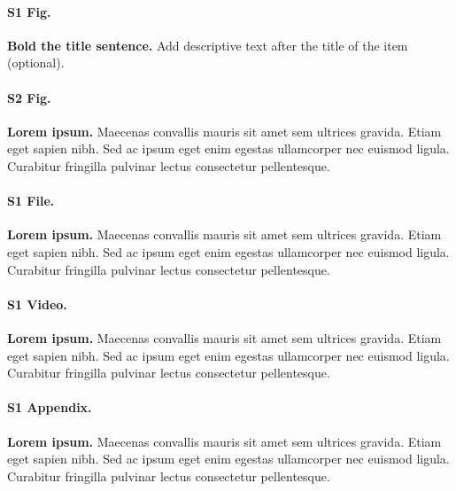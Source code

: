 \documentclass[10pt,letterpaper]{article}
\begin{document}
\paragraph*{S1 Fig.}
\label{S1_Fig}
{\bf Bold the title sentence.} Add descriptive text after the title of the item (optional).

\paragraph*{S2 Fig.}
\label{S2_Fig}
{\bf Lorem ipsum.} Maecenas convallis mauris sit amet sem ultrices gravida. Etiam eget sapien nibh. Sed ac ipsum eget enim egestas ullamcorper nec euismod ligula. Curabitur fringilla pulvinar lectus consectetur pellentesque.

\paragraph*{S1 File.}
\label{S1_File}
{\bf Lorem ipsum.}  Maecenas convallis mauris sit amet sem ultrices gravida. Etiam eget sapien nibh. Sed ac ipsum eget enim egestas ullamcorper nec euismod ligula. Curabitur fringilla pulvinar lectus consectetur pellentesque.

\paragraph*{S1 Video.}
\label{S1_Video}
{\bf Lorem ipsum.}  Maecenas convallis mauris sit amet sem ultrices gravida. Etiam eget sapien nibh. Sed ac ipsum eget enim egestas ullamcorper nec euismod ligula. Curabitur fringilla pulvinar lectus consectetur pellentesque.

\paragraph*{S1 Appendix.}
\label{S1_Appendix}
{\bf Lorem ipsum.} Maecenas convallis mauris sit amet sem ultrices gravida. Etiam eget sapien nibh. Sed ac ipsum eget enim egestas ullamcorper nec euismod ligula. Curabitur fringilla pulvinar lectus consectetur pellentesque.
\end{document}
